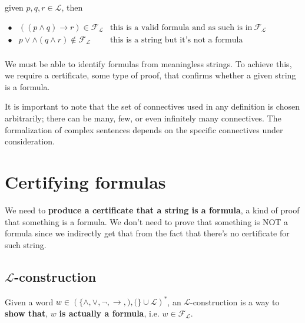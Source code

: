 	\begin{example} given $p,q,r \in \mathcal{L}$, then

	  $
\begin{array}{lcl}
\bullet & ((p \wedge q) \rightarrow r) \in \mathcal{F}_\mathcal{L} & \text{this is a valid formula and as such is in} \ \mathcal{F}_\mathcal{L} \\
\bullet & p \vee \wedge (q \wedge r) \notin \mathcal{F}_\mathcal{L} & \text{this is a string but it's not a formula} \\

\end{array}
$
	\end{example}

	We must be able to identify formulas from meaningless strings. To achieve this, we require a certificate, some type of proof, that confirms whether a given string is a formula.

It is important to note that the set of connectives used in any definition is chosen arbitrarily; there can be many, few, or even infinitely many connectives. The formalization of complex sentences depends on the specific connectives under consideration.


	\section{Certifying formulas}
	We need to \textbf{produce a certificate that a string is a formula}, a kind of proof that something is a formula. We don't need to prove that something is NOT a formula since we indirectly get that from the fact that there's no certificate for such string.

	\subsection{$\mathcal{L}$-construction}
	Given a word $w \in \left(\{\wedge, \vee, \neg, \rightarrow, ), (\} \cup \mathcal{L}\right)^\ast$, an $\mathcal{L}$-construction is a way to \textbf{show that}, $w$ \textbf{is actually a formula}, i.e. $w \in \mathcal{F}_{\mathcal{L}}$.

